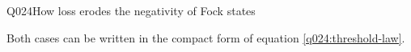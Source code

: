 \begin{entry}{Q024}{How loss erodes the negativity of Fock states}
\begin{solution}[Part (b)]
Both cases can be written in the compact form of equation \eqref{q024:threshold-law}.

\end{solution}

\begin{takeaway}
\end{takeaway}


\end{entry}